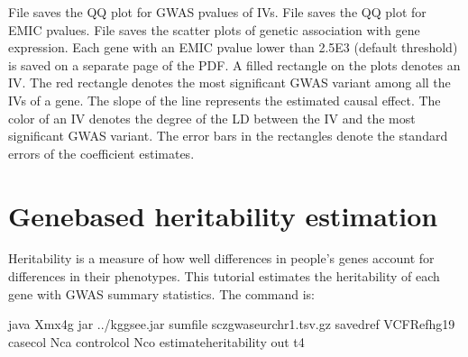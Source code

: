 \documentclass[letterpaper,10pt,english,openany,oneside]{sphinxmanual}
\begin{document}
\sphinxAtStartPar
File  saves the Q\sphinxhyphen{}Q plot for GWAS p\sphinxhyphen{}values of IVs. File  saves the Q\sphinxhyphen{}Q plot for EMIC p\sphinxhyphen{}values. File  saves the scatter plots of genetic association with gene expression. Each gene with an EMIC p\sphinxhyphen{}value lower than 2.5E\sphinxhyphen{}3 (default threshold) is saved on a separate page of the PDF. A filled rectangle on the plots denotes an IV. The red rectangle denotes the most significant GWAS variant among all the IVs of a gene. The slope of the line represents the estimated causal effect. The color of an IV denotes the degree of the LD between the IV and the most significant GWAS variant. The error bars in the rectangles denote the standard errors of the coefficient estimates.


\section{Gene\sphinxhyphen{}based heritability estimation}
\label{\detokenize{quick_tutorials:gene-based-heritability-estimation}}\label{\detokenize{quick_tutorials:t4}}
\sphinxAtStartPar
Heritability is a measure of how well differences in people’s genes account for differences in their phenotypes. This tutorial estimates the heritability of each gene with GWAS summary statistics. The command is:

\begin{sphinxVerbatim}[commandchars=\\\{\}]
java \PYGZhy{}Xmx4g \PYGZhy{}jar ../kggsee.jar 
  \PYGZhy{}\PYGZhy{}sum\PYGZhy{}file scz\PYGZus{}gwas\PYGZus{}eur\PYGZus{}chr1.tsv.gz 
  \PYGZhy{}\PYGZhy{}saved\PYGZhy{}ref VCFRefhg19 
  \PYGZhy{}\PYGZhy{}case\PYGZhy{}col Nca 
  \PYGZhy{}\PYGZhy{}control\PYGZhy{}col Nco 
  \PYGZhy{}\PYGZhy{}estimate\PYGZhy{}heritability 
  \PYGZhy{}\PYGZhy{}out t4
\end{sphinxVerbatim}

\sphinxAtStartPar
{}
\end{document}
